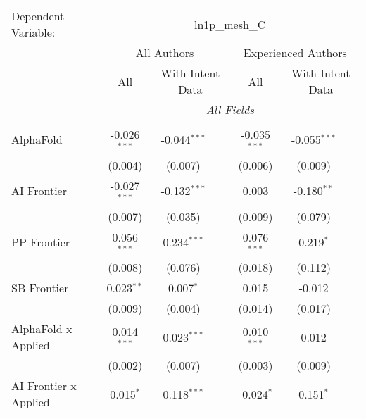 \begingroup
\centering
\begin{tabular}{lcccccc}
   \tabularnewline \midrule \midrule
   Dependent Variable: & \multicolumn{6}{c}{ln1p\_mesh\_C}\\
 & \multicolumn{3}{c}{All Authors} & \multicolumn{3}{c}{Experienced Authors} \\
\cmidrule(lr){2-4} \cmidrule(lr){5-7}
 & \multicolumn{1}{c}{All} & \multicolumn{2}{c}{With Intent Data} & \multicolumn{1}{c}{All} & \multicolumn{2}{c}{With Intent Data} \\
\cmidrule(lr){2-2} \cmidrule(lr){3-4} \cmidrule(lr){5-5} \cmidrule(lr){6-7}
 & \multicolumn{6}{c}{\textit{All Fields}} \\ \\
   AlphaFold                      & -0.026$^{***}$ & -0.044$^{***}$ &                & -0.035$^{***}$ & -0.055$^{***}$ &   \\   
                                  & (0.004)        & (0.007)        &                & (0.006)        & (0.009)        &   \\   
   AI Frontier                    & -0.027$^{***}$ & -0.132$^{***}$ &                & 0.003          & -0.180$^{**}$  &   \\   
                                  & (0.007)        & (0.035)        &                & (0.009)        & (0.079)        &   \\   
   PP Frontier                    & 0.056$^{***}$  & 0.234$^{***}$  &                & 0.076$^{***}$  & 0.219$^{*}$    &   \\   
                                  & (0.008)        & (0.076)        &                & (0.018)        & (0.112)        &   \\   
   SB Frontier                    & 0.023$^{**}$   & 0.007$^{*}$    &                & 0.015          & -0.012         &   \\   
                                  & (0.009)        & (0.004)        &                & (0.014)        & (0.017)        &   \\   
   AlphaFold x Applied            & 0.014$^{***}$  & 0.023$^{***}$  &                & 0.010$^{***}$  & 0.012          &   \\   
                                  & (0.002)        & (0.007)        &                & (0.003)        & (0.009)        &   \\   
   AI Frontier x Applied          & 0.015$^{*}$    & 0.118$^{***}$  &                & -0.024$^{*}$   & 0.151$^{*}$    &   \\   

\end{tabular}
